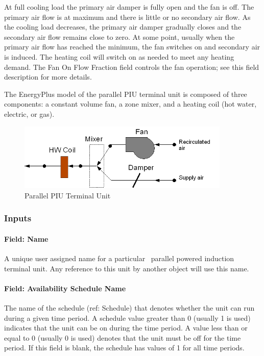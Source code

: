 At full cooling load the primary air damper is fully open and the fan is off. The primary air flow is at maximum and there is little or no secondary air flow. As the cooling load decreases, the primary air damper gradually closes and the secondary air flow remains close to zero. At some point, usually when the primary air flow has reached the minimum, the fan switches on and secondary air is induced. The heating coil will switch on as needed to meet any heating demand. The Fan On Flow Fraction field controls the fan operation; see this field description for more details. 

The EnergyPlus model of the parallel PIU terminal unit is composed of three components: a constant volume fan, a zone mixer, and a heating coil (hot water, electric, or gas).

\begin{figure}[hbtp] %
\centering
\includegraphics[width=0.9\textwidth, height=0.9\textheight, keepaspectratio=true]{media/image271.png}
\caption{Parallel PIU Terminal Unit \protect \label{fig:parallel-piu-terminal-unit}}
\end{figure}

\subsubsection{Inputs}\label{inputs-8-000}

\paragraph{Field: Name}\label{field-name-8-000}

A unique user assigned name for a particular~ parallel powered induction terminal unit. Any reference to this unit by another object will use this name.

\paragraph{Field: Availability Schedule Name}\label{field-availability-schedule-name-8}

The name of the schedule (ref: Schedule) that denotes whether the unit can run during a given time period. A schedule value greater than 0 (usually 1 is used) indicates that the unit can be on during the time period. A value less than or equal to 0 (usually 0 is used) denotes that the unit must be off for the time period. If this field is blank, the schedule has values of 1 for all time periods.

